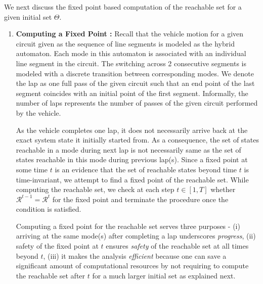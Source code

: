 We next discuss the fixed point based computation of the reachable set for a given initial set $\Theta$.


\begin{enumerate}[wide, labelindent=0pt]
\item \textbf{Computing a Fixed Point :} Recall that the vehicle motion for a given circuit given as the sequence of line segments is modeled as the hybrid automaton. Each mode in this automaton is associated with an individual line segment in the circuit. The switching across 2 consecutive segments is modeled with a discrete transition between corresponding modes. 
%
We denote the lap as one full pass of the given circuit such that an end point of the last segment coincides with an initial point of the first segment. Informally, the number of laps represents the number of passes of the given circuit performed by the vehicle. 
%

As the vehicle completes one lap, it does not necessarily arrive back at the exact system state it initially started from. As a consequence, the set of states reachable in a mode during next lap is not necessarily same as the set of states reachable in this mode during previous lap(s). Since a fixed point at some time $t$ is an evidence that the set of reachable states beyond time $t$ is time-invariant, we attempt to find a fixed point of the reachable set. While computing the reachable set, we check at each step $t \in [1, T]$ whether $\mathcal{R}^{t-1} = \mathcal{R}^t$ for the fixed point and terminate the procedure once the condition is satisfied.

Computing a fixed point for the reachable set serves three  purposes - (i) arriving at the same mode(s) after completing a lap underscores \emph{progress}, (ii) safety of the fixed point at $t$ ensures \emph{safety} of the reachable set at all times beyond $t$, (iii) it makes the analysis \emph{efficient} because one can save a significant amount of computational resources by not requiring to compute the reachable set after $t$ for a much larger initial set as explained next.

%
%


\end{enumerate}
